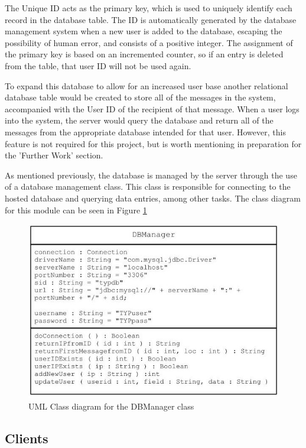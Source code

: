 \documentclass[a4paper,12pt]{report}
\begin{document}
The Unique ID acts as the primary key, which is used to uniquely identify each record in the database table. The ID is automatically generated by the database management system when a new user is added to the database, escaping the possibility of human error, and consists of a positive integer. The assignment of the primary key is based on an incremented counter, so if an entry is deleted from the table, that user ID will not be used again.

To expand this database to allow for an increased user base another relational database table would be created to store all of the messages in the system, accompanied with the User ID of the recipient of that message. When a user logs into the system, the server would query the database and return all of the messages from the appropriate database intended for that user. However, this feature is not required for this project, but is worth mentioning in preparation for the 'Further Work' section. 

As mentioned previously, the database is managed by the server through the use of a database management class. This class is responsible for connecting to the hosted database and querying data entries, among other tasks. The class diagram for this module can be seen in Figure \ref{fig:dbmanclass}

\begin{figure}[htb]
\centering
\includegraphics[scale=0.4]{images/dbmanagerclass.jpg}
\caption{UML Class diagram for the DBManager class}
\label{fig:dbmanclass}
\end{figure}

\subsection{Clients}
\end{document}
